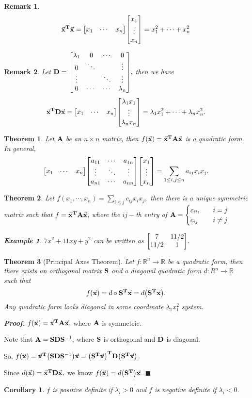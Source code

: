 \documentclass[12pt, a4paper]{article}
\newtheorem{thm}{Theorem}[subsection]
\newtheorem{eg}{Example}[subsection]
\newtheorem{cor}{Corollary}[section]
\newtheorem*{rmk}{\indent Remark}
\newenvironment*{prf}{\par\indent\textbf{\textit{Proof. }}}{\hfill $\blacksquare$\par}
\def\R{{\mathbb{R}}}
\def\T{{\vb{T}}}
\def\vecx{\va{x}}
\def\matrixA{\vb{A}}
\def\matrixD{\vb{D}}
\def\matrixS{\vb{S}}
\def\dsst{\displaystyle}
\begin{document}
\begin{rmk}
	\[\vecx^\T\vecx=\mqty[x_1&\cdots&x_n]\mqty[x_1\\\vdots\\x_n]=x_1^2+\cdots+x_n^2\]	
\end{rmk}
\begin{rmk}
	Let $\matrixD=\mqty[\lambda_1&0&\cdots&0\\0&\ddots&&\vdots\\\vdots&&\ddots&\vdots\\0&\cdots&\cdots&\lambda_n],$ then we have \[\vecx^\T\matrixD\vecx=\mqty[x_1&\cdots&x_n]\mqty[\lambda_1x_1\\\vdots\\\lambda_nx_n]=\lambda_1x_1^2+\cdots+\lambda_nx_n^2.\]	
\end{rmk}
\begin{thm}
	Let $\matrixA$ be an $n\times n$ matrix, then $f(\vecx)=\vecx^\T\matrixA\vecx$ is a quadratic form. In general, \[\mqty[x_1&\cdots&x_n]\mqty[a_{11}&\cdots&a_{1n}\\\vdots&\ddots&\vdots\\a_{n1}&\cdots&a_{nn}]\mqty[x_1\\\vdots\\x_n]=\sum_{1\leq i, j\leq n}a_{ij}x_ix_j.\]	
\end{thm}
\begin{thm}
	Let $f(x_1,\cdots,x_n)=\dsst\sum_{i\leq j}c_{ij}x_ix_j,$ then there is a unique symmetric matrix such that $f=\vecx^\T\matrixA\vecx,$ where the $ij-$th entry of $\matrixA=\begin{cases}c_{ii},\quad& i=j\\c_{ij}\quad& i\neq j\end{cases}$
	\begin{eg}
		$7x^2+11xy+y^2$ can be written as $\mqty[7&11/2\\11/2&1].$
	\end{eg}	
\end{thm}
\begin{thm}[Principal Axes Theorem]
	Let $f:\R^n\to\R$ be a quadratic form, then there exists an orthogonal matrix $\matrixS$ and a diagonal quadratic form $d:R^n\to\R$ such that \[f(\vecx)=d\circ\matrixS^\T\vecx=d\qty(\matrixS^\T\vecx).\] Any quadratic form looks diagonal in some coordinate $\lambda_1x_1^2$ system. 
\end{thm}
\begin{prf}
	$f(\vecx)=\vecx^\T\matrixA\vecx,$ where $\matrixA$ is symmetric.\par Note that $\matrixA=\matrixS\matrixD\matrixS^{-1},$ where $\matrixS$ is orthogonal and $\matrixD$ is diagonal. \par So, $f(\vecx)=\vecx^\T\qty(\matrixS\matrixD\matrixS^{-1})\vecx=\qty(\matrixS^\T\vecx)^\T\matrixD\qty(\matrixS^\T\vecx).$\par Since $d(\vecx)=\vecx^\T\matrixD\vecx,$ we know $f(\vecx)=d\qty(\matrixS^\T)\vecx$.
\end{prf}
\begin{cor}
	$f$ is positive definite if $\lambda_i>0$ and $f$ is negative definite if $\lambda_i<0.$
\end{cor}
\end{document}
